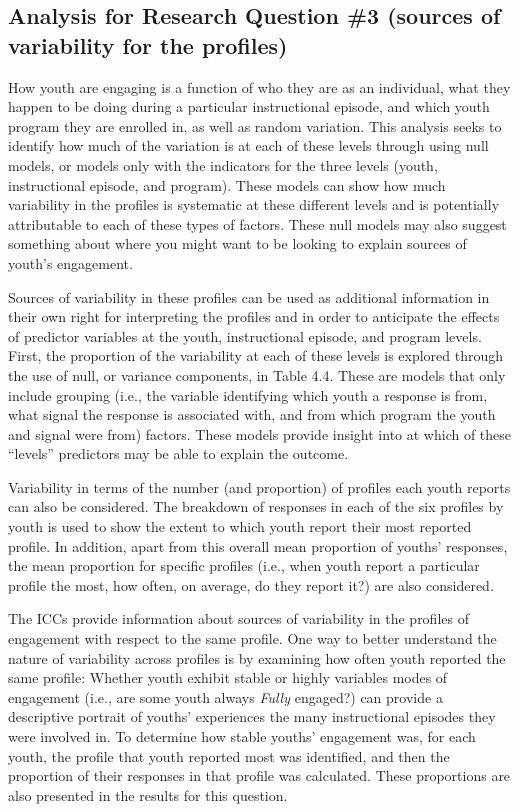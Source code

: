 \documentclass[]{msu-thesis}
\theoremstyle{definition}
\theoremstyle{definition}
\theoremstyle{definition}
\theoremstyle{remark}
\begin{document}
\subsection{Analysis for Research Question \#3 (sources of variability
for the
profiles)}\label{analysis-for-research-question-3-sources-of-variability-for-the-profiles}

How youth are engaging is a function of who they are as an individual,
what they happen to be doing during a particular instructional episode,
and which youth program they are enrolled in, as well as random
variation. This analysis seeks to identify how much of the variation is
at each of these levels through using null models, or models only with
the indicators for the three levels (youth, instructional episode, and
program). These models can show how much variability in the profiles is
systematic at these different levels and is potentially attributable to
each of these types of factors. These null models may also suggest
something about where you might want to be looking to explain sources of
youth's engagement.

Sources of variability in these profiles can be used as additional
information in their own right for interpreting the profiles and in
order to anticipate the effects of predictor variables at the youth,
instructional episode, and program levels. First, the proportion of the
variability at each of these levels is explored through the use of null,
or variance components, in Table 4.4. These are models that only include
grouping (i.e., the variable identifying which youth a response is from,
what signal the response is associated with, and from which program the
youth and signal were from) factors. These models provide insight into
at which of these ``levels'' predictors may be able to explain the
outcome.

Variability in terms of the number (and proportion) of profiles each
youth reports can also be considered. The breakdown of responses in each
of the six profiles by youth is used to show the extent to which youth
report their most reported profile. In addition, apart from this overall
mean proportion of youths' responses, the mean proportion for specific
profiles (i.e., when youth report a particular profile the most, how
often, on average, do they report it?) are also considered.

The ICCs provide information about sources of variability in the
profiles of engagement with respect to the same profile. One way to
better understand the nature of variability across profiles is by
examining how often youth reported the same profile: Whether youth
exhibit stable or highly variables modes of engagement (i.e., are some
youth always \emph{Fully} engaged?) can provide a descriptive portrait
of youths' experiences the many instructional episodes they were
involved in. To determine how stable youths' engagement was, for each
youth, the profile that youth reported most was identified, and then the
proportion of their responses in that profile was calculated. These
proportions are also presented in the results for this question.
\end{document}
